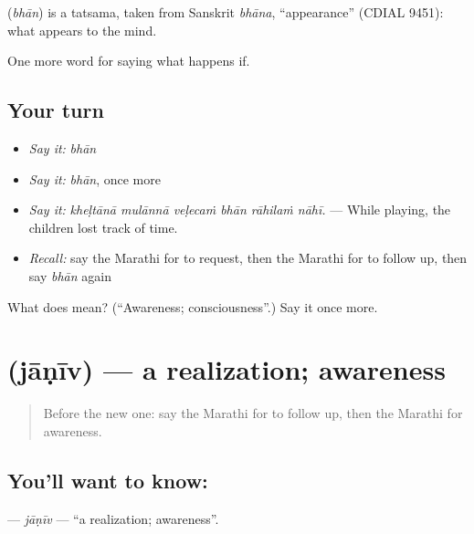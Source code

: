 \begin{cousinweb}
\textbf{} (\emph{bhān}) is a tatsama, taken from Sanskrit \emph{bhāna}, \textquotedblleft{}appearance\textquotedblright{} (CDIAL 9451): what appears to the mind.
\end{cousinweb}

\begin{grammarlens}[title={What you've built}]
One more word for saying what happens if.
\end{grammarlens}

\subsection*{Your turn}
\begin{itemize}
\raggedright
  \item \emph{Say it:} \emph{bhān}
  \item \emph{Say it:} \emph{bhān}, once more
  \item \emph{Say it:} \emph{kheḷtānā mulānnā veḷecaṁ bhān rāhilaṁ nāhī.} — While playing, the children lost track of time.
  \item \emph{Recall:} say the Marathi for to request, then the Marathi for to follow up, then say \emph{bhān} again
\end{itemize}

\begin{tcolorbox}[breakable,colback=teal!4,colframe=teal!35!black,title={Before you move on}]
What does  mean? (\textquotedblleft{}Awareness; consciousness\textquotedblright{}.) Say it once more.
\end{tcolorbox}
\section[\texorpdfstring{\mr{जाणीव} (jāṇīv)}{जाणीव (jāṇīv)}]{ (jāṇīv) — a realization; awareness}

\label{lesson:MR-C394-janiv}



\begin{quote}
Before the new one: say the Marathi for to follow up, then the Marathi for awareness.
\end{quote}

\subsection*{You'll want to know: }
\textbf{} — \emph{jāṇīv} — \textquotedblleft{}a realization; awareness\textquotedblright{}.

